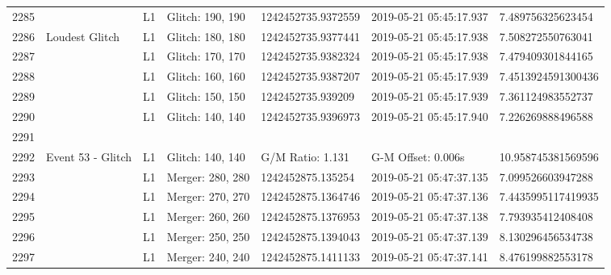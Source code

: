 \begin{longtable}{lllllll}
2285 &                                                    &       L1 &  Glitch: 190, 190 &  1242452735.9372559 &  2019-05-21 05:45:17.937 &   7.489756325623454 \\
2286 &                                     Loudest Glitch &       L1 &  Glitch: 180, 180 &  1242452735.9377441 &  2019-05-21 05:45:17.938 &   7.508272550763041 \\
2287 &                                                    &       L1 &  Glitch: 170, 170 &  1242452735.9382324 &  2019-05-21 05:45:17.938 &   7.479409301844165 \\
2288 &                                                    &       L1 &  Glitch: 160, 160 &  1242452735.9387207 &  2019-05-21 05:45:17.939 &  7.4513924591300436 \\
2289 &                                                    &       L1 &  Glitch: 150, 150 &   1242452735.939209 &  2019-05-21 05:45:17.939 &   7.361124983552737 \\
2290 &                                                    &       L1 &  Glitch: 140, 140 &  1242452735.9396973 &  2019-05-21 05:45:17.940 &   7.226269888496588 \\
2291 &                                                    &          &                   &                     &                          &                     \\
2292 &                                  Event 53 - Glitch &       L1 &  Glitch: 140, 140 &    G/M Ratio: 1.131 &       G-M Offset: 0.006s &  10.958745381569596 \\
2293 &                                                    &       L1 &  Merger: 280, 280 &   1242452875.135254 &  2019-05-21 05:47:37.135 &   7.099526603947288 \\
2294 &                                                    &       L1 &  Merger: 270, 270 &  1242452875.1364746 &  2019-05-21 05:47:37.136 &  7.4435995117419935 \\
2295 &                                                    &       L1 &  Merger: 260, 260 &  1242452875.1376953 &  2019-05-21 05:47:37.138 &   7.793935412408408 \\
2296 &                                                    &       L1 &  Merger: 250, 250 &  1242452875.1394043 &  2019-05-21 05:47:37.139 &   8.130296456534738 \\
2297 &                                                    &       L1 &  Merger: 240, 240 &  1242452875.1411133 &  2019-05-21 05:47:37.141 &   8.476199882553178 \\

\end{longtable}
